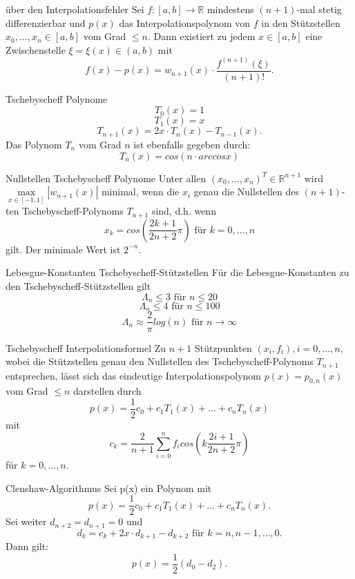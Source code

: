 \begin{flashcard}[Satz]{über den Interpolationsfehler}
Sei $f: [a,b] \rightarrow \mathbb{R}$ mindestens $(n+1)$-mal stetig differenzierbar und $p(x)$
das Interpolationspolynom von $f$ in den Stützstellen $x_0, \ldots , x_n \in [a,b]$ vom Grad $\leq n$.
Dann existiert zu jedem $x \in [a,b]$ eine Zwischenstelle $\xi = \xi(x) \in (a,b)$ mit
$$
	f(x)-p(x) = w_{n+1}(x) \cdot \frac{f^{(n+1)}(\xi)}{(n+1)!}.
$$
\end{flashcard}

\begin{flashcard}[Definition]{Tschebyscheff Polynome}
$$
	T_0(x) = 1
$$
$$
	T_1(x) = x
$$
$$
	T_{n+1}(x) = 2x \cdot T_n(x) - T_{n-1}(x).
$$
Das Polynom $T_n$ vom Grad $n$ ist ebenfalls gegeben durch:
$$
	T_n(x) = cos(n \cdot arccos x)
$$
\end{flashcard}

\begin{flashcard}[Satz]{Nullstellen Tschebyscheff Polynome}
Unter allen $(x_0, \ldots, x_n)^T \in \mathbb{R}^{n+1}$ wird $\max\limits_{x \in [-1,1]} |w_{n+1}(x)|$
minimal, wenn die $x_i$ genau die Nullstellen des $(n+1)$-ten Tschebyscheff-Polynoms $T_{n+1}$ sind, d.h. wenn
$$
	x_k = cos\left(\frac{2k+1}{2n+2} \pi\right) \text{ für } k=0, \ldots , n
$$
gilt. Der minimale Wert ist $2^{-n}$.
\end{flashcard}

\begin{flashcard}[Satz]{Lebesgue-Konstanten Tschebyscheff-Stützstellen}
Für die Lebesgue-Konstanten zu den Tschebyscheff-Stützstellen gilt
$$
	\Lambda_n \leq 3 \text{ für } n \leq 20
$$
$$
	\Lambda_n \leq 4 \text{ für } n \leq 100
$$
$$
	\Lambda_n \approx \frac{2}{\pi} log(n) \text{ für }  n \rightarrow \infty
$$
\end{flashcard}

\begin{flashcard}[Satz]{Tschebyscheff Interpolationsformel}
Zu $n+1$ Stützpunkten $(x_i, f_i), i = 0, \ldots , n$, wobei die Stützstellen genau den Nullstellen
des Tschebyscheff-Polynoms $T_{n+1}$ entsprechen, lässt sich das eindeutige Interpolationspolynom
$p(x) = p_{0,n}(x)$ vom Grad $\leq n$ darstellen durch
$$
	p(x) = \frac{1}{2}c_0 + c_1T_1(x) + \ldots + c_nT_n(x)
$$
mit
$$
	c_k = \frac{2}{n+1}\sum_{i=0}^n f_i cos \left(k \frac{2i+1}{2n+2}\pi \right)
$$
für $k=0, \ldots, n$.
\end{flashcard}

\begin{flashcard}[Satz]{Clenshaw-Algorithmus}
Sei p(x) ein Polynom mit
$$
	p(x) = \frac{1}{2}c_0 + c_1T_1(x) + \ldots + c_nT_n(x).
$$
Sei weiter $d_{n+2} = d_{n+1} = 0$ und
$$
	d_k = c_k + 2x \cdot d_{k+1} - d_{k+2} \text{ für } k = n, n-1, \ldots, 0.
$$
Dann gilt:
$$
	p(x) = \frac{1}{2}(d_0 - d_2).
$$
\end{flashcard}

